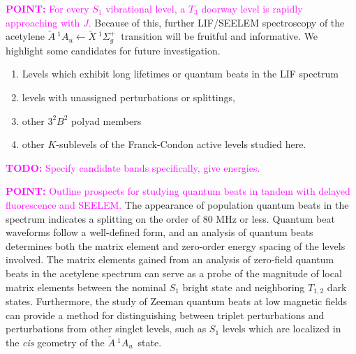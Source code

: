 \documentclass[12pt]{mitthesis}
\newcommand{\TODO} [1]{\textcolor{magenta}{\textbf{TODO:} #1}}
\newcommand{\POINT}[1]{\textcolor{magenta}{\textbf{POINT:} #1}}
\newcommand{\astate}{$
  \tilde{A} \: ^1\!A_u
  $}
\newcommand{\AtoX}{$
  \tilde{A} \: ^1\!A_u 
  \leftarrow 
  \tilde{X} \: ^1\Sigma_g^+
  $}
\begin{document}
\POINT{For every $S_1$ vibrational level, a $T_3$ doorway level is
  rapidly approaching with $J$.}  Because of this, further LIF/SEELEM
spectroscopy of the acetylene \AtoX\ transition will be fruitful and
informative.  We highlight some candidates for future investigation.
\begin{enumerate}
\item Levels which exhibit long lifetimes or quantum beats in the LIF
  spectrum
\item levels with unassigned perturbations or splittings,
\item other $3^2B^2$ polyad members
\item other $K$-sublevels of the Franck-Condon active levels studied
  here.  
\end{enumerate}
\TODO{Specify candidate bands specifically, give energies.}

\POINT{Outline prospects for studying quantum beats in tandem with
  delayed fluorescence and SEELEM.}  The appearance of population
quantum beats in the spectrum indicates a splitting on the order of 80
MHz or less.  Quantum beat waveforms follow a well-defined form, and
an analysis of quantum beats determines both the matrix element and
zero-order energy spacing of the levels involved.  The matrix elements
gained from an analysis of zero-field quantum beats in the acetylene
spectrum can serve as a probe of the magnitude of
local matrix elements between the nominal $S_1$ bright state and
neighboring $T_{1,2}$ dark states.  Furthermore, the study of Zeeman
quantum beats at low magnetic fields can provide a method for
distinguishing between triplet perturbations and perturbations from
other singlet levels, such as $S_1$ levels which are localized in the
\emph{cis} geometry of the \astate\ state.

 

\end{document}
